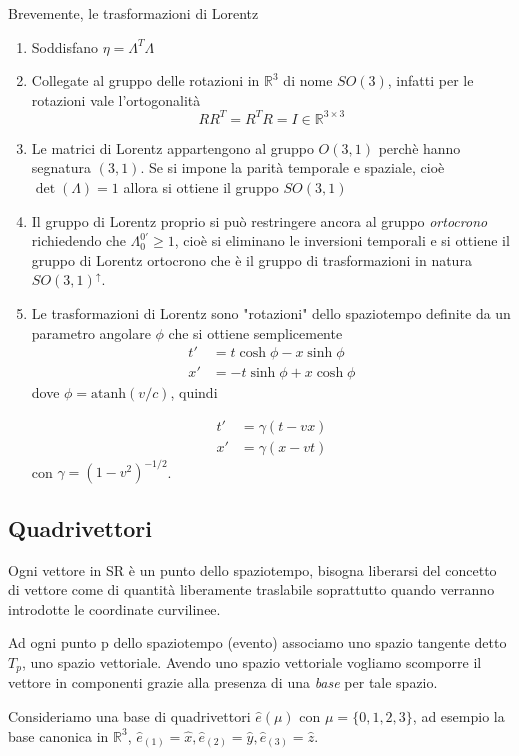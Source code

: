 \documentclass[twoside]{article}
\begin{document}
Brevemente, le trasformazioni di Lorentz
\begin{enumerate}
\item Soddisfano $\eta = \Lambda^T \Lambda $
\item Collegate al gruppo delle rotazioni in $\mathbb{R}^3$ di nome $SO(3)$, infatti per le rotazioni vale l'ortogonalità 
$$
R R^T = R^T R = I \in \mathbb{R}^{3\times 3}
$$
\item Le matrici di Lorentz appartengono al gruppo $O(3,1)$ perchè hanno segnatura $(3,1)$. Se si impone la parità temporale e spaziale, cioè $\det(\Lambda)=1$ allora si ottiene il gruppo $SO(3,1)$
\item Il gruppo di Lorentz proprio si può restringere ancora al gruppo \emph{ortocrono} richiedendo che $\Lambda^{0'}_0 \geq 1$, cioè si eliminano le inversioni temporali e si ottiene il gruppo di Lorentz ortocrono che è il gruppo di trasformazioni in natura $SO(3,1)^\uparrow$.
\item Le trasformazioni di Lorentz sono "rotazioni" dello spaziotempo definite da un parametro angolare $\phi$ che si ottiene semplicemente
\begin{align*}
	t'  &= t \cosh \phi - x \sinh \phi \\
	x'  &= -t \sinh \phi + x \cosh \phi
\end{align*}
dove $\phi = \textrm{atanh} (v/c)$, quindi 

\begin{align*}
	t' &= \gamma (t-vx) \\
	x' &= \gamma (x-vt)
\end{align*}
con $\gamma=(1-v^2)^{-1/2}$.
\end{enumerate}

\subsection{Quadrivettori}

Ogni vettore in SR è un punto dello spaziotempo, bisogna liberarsi del concetto di vettore come di quantità liberamente traslabile soprattutto quando verranno introdotte le coordinate curvilinee.

Ad ogni punto p dello spaziotempo (evento) associamo uno spazio tangente detto $T_p$, uno spazio vettoriale. Avendo uno spazio vettoriale vogliamo scomporre il vettore in componenti grazie alla presenza di una \emph{base} per tale spazio.

Consideriamo una base di quadrivettori $\hat{e}(\mu)$ con $\mu=\{0,1,2,3\}$, ad esempio la base canonica in $\mathbb{R}^3$, $\hat{e}_{(1)}=\hat{x},\hat{e}_{(2)}=\hat{y},\hat{e}_{(3)}=\hat{z}$.
\end{document}
